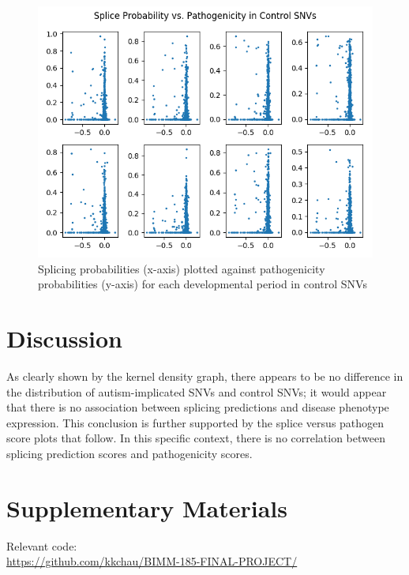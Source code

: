 \documentclass[12pt]{article}
\begin{document}
\begin{figure}[ht]
\centering
    \includegraphics[width=\textwidth,height=\textheight,keepaspectratio]{../analysis/neg_corr.png}
    \caption{Splicing probabilities (x-axis) plotted against pathogenicity probabilities (y-axis) for each developmental period in control SNVs}
\end{figure}

\pagebreak

\section{Discussion}
As clearly shown by the kernel density graph, there appears to be no difference
in the distribution of autism-implicated SNVs and control SNVs; it would appear
that there is no association between splicing predictions and disease phenotype
expression. This conclusion is further supported by the splice versus 
pathogen score plots that follow. In this specific context, there is no 
correlation between splicing prediction scores and pathogenicity scores.

\section{Supplementary Materials}
Relevant code:\\
\href{https://github.com/kkchau/bimm185/}{https://github.com/kkchau/BIMM-185-FINAL-PROJECT/}
\end{document}
